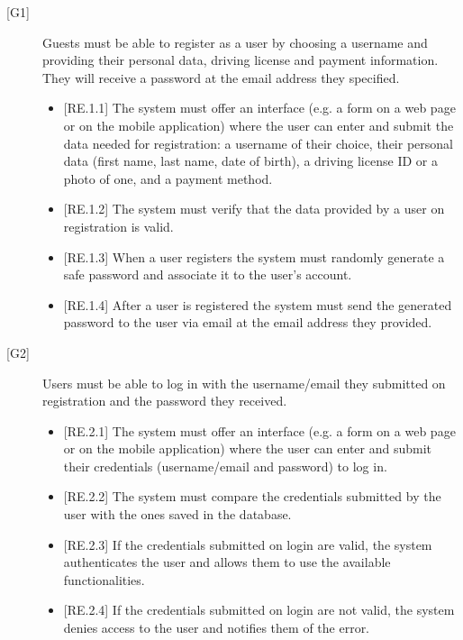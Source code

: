 \documentclass[english]{article}
\begin{document}
\begin{description}

\item[{[G1]}]{Guests must be able to register as a user by choosing a username and providing their personal data, driving license and payment information. They will receive a password at the email address they specified.

\begin{itemize}
\item{[RE.1.1] The system must offer an interface (e.g. a form on a web page or on the mobile application) where the user can enter and submit the data needed for registration:
a username of their choice, their personal data (first name, last name, date of birth), a driving license ID or a photo of one, and a payment method.}
\item{[RE.1.2] The system must verify that the data provided by a user on registration is valid.}
\item{[RE.1.3] When a user registers the system must randomly generate a safe password and associate it to the user’s account.}
\item{[RE.1.4] After a user is registered the system must send the generated password to the user via email at the email address they provided.}
\end{itemize}
}

\item[{[G2]}]{Users must be able to log in with the username/email they submitted on registration and the password they received.
\begin{itemize}
	\item{[RE.2.1] The system must offer an interface (e.g. a form on a web page or on the mobile application) where the user can enter and submit their credentials (username/email and password) to log in.}
	\item{[RE.2.2] The system must compare the credentials submitted by the user with the ones saved in the database.}
	\item{[RE.2.3] If the credentials submitted on login are valid, the system authenticates the user and allows them to use the available functionalities.}
	\item{[RE.2.4] If the credentials submitted on login are not valid, the system denies access to the user and notifies them of the error.}
\end{itemize}
}


\end{description}
\end{document}
